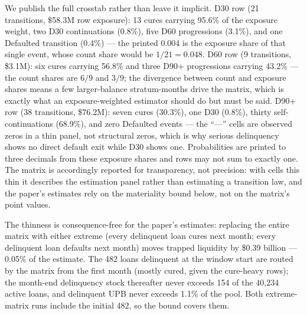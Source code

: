 \documentclass[12pt]{article}
\begin{document}
We publish the full crosstab rather than leave it implicit. D30 row (21 transitions, \$58.3M row exposure): 13 cures carrying 95.6\% of the exposure weight, two D30 continuations (0.8\%), five D60 progressions (3.1\%), and one Defaulted transition (0.4\%) --- the printed 0.004 is the exposure share of that single event, whose count share would be $1/21 = 0.048$. D60 row (9 transitions, \$3.1M): six cures carrying 56.8\% and three D90+ progressions carrying 43.2\% --- the count shares are $6/9$ and $3/9$; the divergence between count and exposure shares means a few larger-balance stratum-months drive the matrix, which is exactly what an exposure-weighted estimator should do but must be said. D90+ row (38 transitions, \$76.2M): seven cures (30.3\%), one D30 (0.8\%), thirty self-continuations (68.9\%), and zero Defaulted events --- the ``---'' cells are observed zeros in a thin panel, not structural zeros, which is why serious delinquency shows no direct default exit while D30 shows one. Probabilities are printed to three decimals from these exposure shares and rows may not sum to exactly one. The matrix is accordingly reported for transparency, not precision: with cells this thin it describes the estimation panel rather than estimating a transition law, and the paper's estimates rely on the materiality bound below, not on the matrix's point values.

The thinness is consequence-free for the paper's estimates: replacing the entire matrix with either extreme (every delinquent loan cures next month; every delinquent loan defaults next month) moves trapped liquidity by \$0.39 billion --- 0.05\% of the estimate. The 482 loans delinquent at the window start are routed by the matrix from the first month (mostly cured, given the cure-heavy rows); the month-end delinquency stock thereafter never exceeds 154 of the 40,234 active loans, and delinquent UPB never exceeds 1.1\% of the pool. Both extreme-matrix runs include the initial 482, so the bound covers them.
\end{document}

